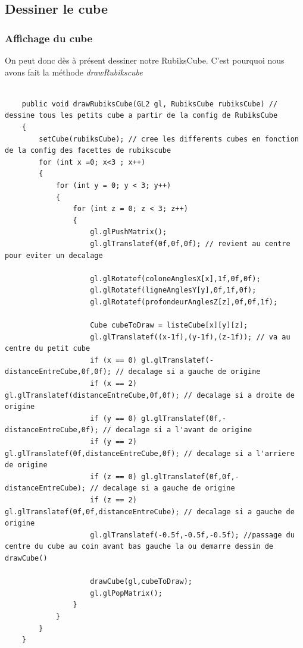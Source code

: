 \subsection{Dessiner le cube}
\subsubsection{Affichage du cube}
On peut donc dès à présent dessiner notre RubiksCube. C’est pourquoi nous avons fait la méthode \textit{drawRubikscube} 
\begin{lstlisting}[frame=single]  % Start your code-block

    public void drawRubiksCube(GL2 gl, RubiksCube rubiksCube) // dessine tous les petits cube a partir de la config de RubiksCube
    {
        setCube(rubiksCube); // cree les differents cubes en fonction de la config des facettes de rubikscube
        for (int x =0; x<3 ; x++)
        {
            for (int y = 0; y < 3; y++)
            {
                for (int z = 0; z < 3; z++)
                {
                    gl.glPushMatrix();
                    gl.glTranslatef(0f,0f,0f); // revient au centre pour eviter un decalage

                    gl.glRotatef(coloneAnglesX[x],1f,0f,0f);
                    gl.glRotatef(ligneAnglesY[y],0f,1f,0f);
                    gl.glRotatef(profondeurAnglesZ[z],0f,0f,1f);

                    Cube cubeToDraw = listeCube[x][y][z];
                    gl.glTranslatef((x-1f),(y-1f),(z-1f)); // va au centre du petit cube
                    if (x == 0) gl.glTranslatef(-distanceEntreCube,0f,0f); // decalage si a gauche de origine
                    if (x == 2) gl.glTranslatef(distanceEntreCube,0f,0f); // decalage si a droite de origine
                    if (y == 0) gl.glTranslatef(0f,-distanceEntreCube,0f); // decalage si a l'avant de origine
                    if (y == 2) gl.glTranslatef(0f,distanceEntreCube,0f); // decalage si a l'arriere de origine
                    if (z == 0) gl.glTranslatef(0f,0f,-distanceEntreCube); // decalage si a gauche de origine
                    if (z == 2) gl.glTranslatef(0f,0f,distanceEntreCube); // decalage si a gauche de origine
                    gl.glTranslatef(-0.5f,-0.5f,-0.5f); //passage du centre du cube au coin avant bas gauche la ou demarre dessin de drawCube()

                    drawCube(gl,cubeToDraw);
                    gl.glPopMatrix();
                }
            }
        }
    }

\end{lstlisting}


